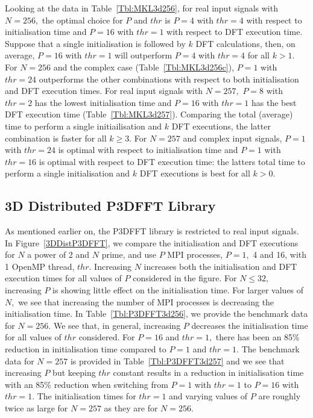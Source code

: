 \documentclass[a4paper]{article}
\begin{document}
Looking at the data in Table~\ref{Tbl:MKL3d256}, for real input
signals with $N=256,$ the optimal choice for $P$ and $thr$ is $P=4$
with $thr=4$ with respect to initialisation time and $P=16$ with
$thr=1$ with respect to DFT execution time. Suppose that a single
initialisation is followed by $k$ DFT calculations, then, on average,
$P=16$ with $thr=1$ will outperform $P=4$ with $thr=4$ for all $k>1.$
For $N=256$ and the complex case (Table~\ref{Tbl:MKL3d256c}), $P=1$
with $thr=24$ outperforms the other combinations with respect to both
initialisation and DFT execution times. For real input signals with
$N=257,$ $P=8$ with $thr=2$ has the lowest initialisation time and
$P=16$ with $thr=1$ has the best DFT execution time
(Table~\ref{Tbl:MKL3d257}). Comparing the total (average) time to
perform a single initiailisation and $k$ DFT executions, the latter
combination is faster for all $k\ge 3.$ For $N=257$ and complex input
signals, $P=1$ with $thr=24$ is optimal with respect to initialisation
time and $P=1$ with $thr=16$ is optimal with respect to DFT execution
time: the latters total time to perform a single initialisation and
$k$ DFT executions is best for all $k>0.$





\subsection{3D Distributed P3DFFT Library}\label{Sec:3DDistP3DFFT}

As mentioned earlier on, the P3DFFT library is restricted to real
input signals. In Figure~\ref{3DDistP3DFFT}, we compare the
initialisation and DFT executions for $N$ a power of 2 and $N$ prime,
and use $P$ MPI processes, $P=1,$ 4 and 16, with 1 OpenMP thread,
$thr.$ Increasing $N$ increases both the initialisation and DFT
execution times for all values of $P$ considered in the figure. For
$N\le 32,$ increasing $P$ is showing little effect on the
initialisation time. For larger values of $N,$ we see that increasing
the number of MPI processes is decreasing the initialisation time. In
Table~\ref{Tbl:P3DFFT3d256}, we provide the benchmark data for
$N=256.$ We see that, in general, increasing $P$ decreases the
initialisation time for all values of $thr$ considered. For $P=16$ and
$thr=1,$ there has been an 85\% reduction in initialisation time
compared to $P=1$ and $thr=1.$ The benchmark data for $N=257$ is
provided in Table~\ref{Tbl:P3DFFT3d257} and we see that increasing $P$
but keeping $thr$ constant results in a reduction in initialisation
time with an 85\% reduction when switching from $P=1$ with $thr=1$ to
$P=16$ with $thr=1.$ The initialisation times for $thr=1$ and varying
values of $P$ are roughly twice as large for $N=257$ as they are for
$N=256.$
\end{document}

